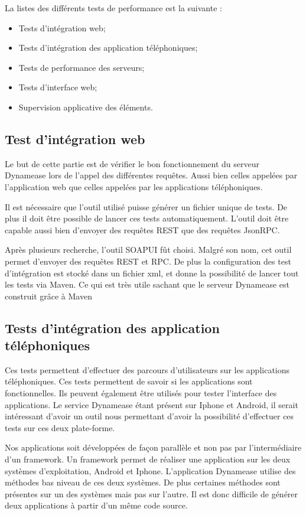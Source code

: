 La listes des différents tests de performance est la suivante :

\begin{itemize}
	\item Tests d'intégration web;
	\item Tests d'intégration des application téléphoniques;
	\item Tests de performance des serveurs;
	\item Tests d'interface web;
	\item Supervision applicative des éléments.
\end{itemize}

\subsection{Test d'intégration web}

Le but de cette partie est de vérifier le bon fonctionnement du serveur Dynamease lors de l'appel des différentes requêtes. Aussi bien celles appelées par l'application web que celles appelées par les applications téléphoniques.

Il est nécessaire que l'outil utilisé puisse générer un fichier unique de tests. De plus il doit être possible de lancer ces tests automatiquement. L'outil doit être capable aussi bien d'envoyer des requêtes REST que des requêtes JsonRPC.

Après plusieurs recherche, l'outil SOAPUI fût choisi. Malgré son nom, cet outil permet d'envoyer des requêtes REST et RPC. De plus la configuration des test d'intégration est stocké dans un fichier xml, et donne la possibilité de lancer tout les tests via Maven. Ce qui est très utile sachant que le serveur Dynamease est construit grâce à Maven

\subsection{Tests d'intégration des application téléphoniques}

Ces tests permettent d'effectuer des parcours d'utilisateurs sur les applications téléphoniques. Ces tests permettent de savoir si les applications sont fonctionnelles. Ils peuvent également être utilisés pour tester l'interface des applications. Le service Dynamease étant présent sur Iphone et Android, il serait intéressant d'avoir un outil nous permettant d'avoir la possibilité d'effectuer ces tests sur ces deux plate-forme. 

Nos applications soit développées de façon parallèle et non pas par l'intermédiaire d'un framework. Un framework permet de réaliser une application sur les deux systèmes d'exploitation, Android et Iphone. L'application Dynamease utilise des méthodes bas niveau de ces deux systèmes. De plus certaines méthodes sont présentes sur un des systèmes mais pas sur l'autre. Il est donc difficile de générer deux applications à partir d'un même code source.

